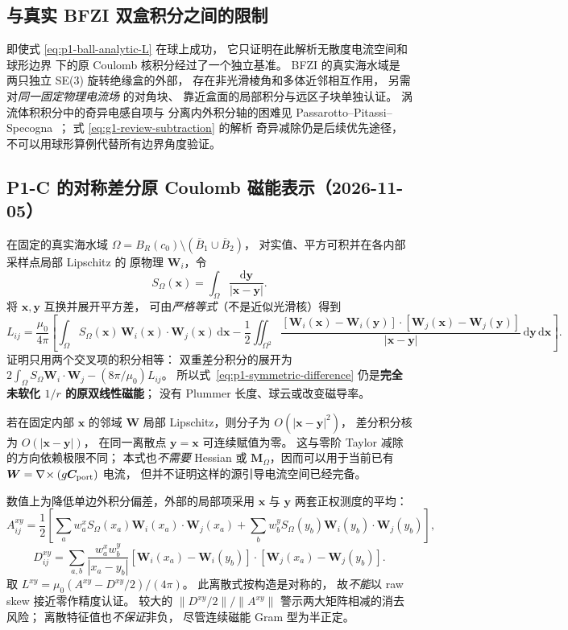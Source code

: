 \subsection{与真实 BFZI 双盒积分之间的限制}
即使式 \eqref{eq:p1-ball-analytic-L} 在球上成功，
它只证明在此解析无散度电流空间和球形边界
下的原 Coulomb 核积分经过了一个独立基准。
BFZI 的真实海水域是
两只独立 SE(3) 旋转绝缘盒的外部，
存在非光滑棱角和多体近邻相互作用，
另需对\emph{同一固定物理电流场} 的对角块、
靠近盒面的局部积分与远区子块单独认证。
涡流体积积分中的奇异电感自项与
分离内外积分轴的困难见
Passarotto--Pitassi--Specogna~\cite{passarotto2022}；
式 \eqref{eq:g1-review-subtraction} 的解析
奇异减除仍是后续优先途径，
不可以用球形算例代替所有边界角度验证。


\subsection{P1-C 的对称差分原 Coulomb 磁能表示（2026-11-05）}
\label{sec:p1-symmetric-difference}
在固定的真实海水域
$\Omega=B_R(c_0)\setminus(\overline B_1\cup\overline B_2)$，
对实值、平方可积并在各内部采样点局部 Lipschitz 的
原物理 $\bm W_i$，令
\[
 S_\Omega(\bm x)=\int_\Omega
  \frac{\mathrm d\bm y}{|\bm x-\bm y|}.
\]
将 $\bm x,\bm y$ 互换并展开平方差，
可由\emph{严格等式}（不是近似光滑核）得到
\begin{equation}
\label{eq:p1-symmetric-difference}
\boxed{
 L_{ij}=\frac{\mu_0}{4\pi}
 \left[
 \int_\Omega S_\Omega(\bm x)\,
      \bm W_i(\bm x)\cdot\bm W_j(\bm x)\,\mathrm d\bm x
 -\frac12\iint_{\Omega^2}
 \frac{[\bm W_i(\bm x)-\bm W_i(\bm y)]\cdot
       [\bm W_j(\bm x)-\bm W_j(\bm y)]}
      {|\bm x-\bm y|}\,\mathrm d\bm y\,\mathrm d\bm x
 \right].
}
\end{equation}
证明只用两个交叉项的积分相等：
双重差分积分的展开为
$2\int_\Omega S_\Omega\bm W_i\cdot\bm W_j
 -(8\pi/\mu_0)L_{ij}$。
所以式~\eqref{eq:p1-symmetric-difference}
仍是\textbf{完全未软化 $1/r$ 的原双线性磁能}；
没有 Plummer 长度、球云或改变磁导率。

若在固定内部 $\bm x$ 的邻域
$\bm W$ 局部 Lipschitz，则分子为
$O(|\bm x-\bm y|^2)$，
差分积分核为 $O(|\bm x-\bm y|)$，
在同一离散点 $\bm y=\bm x$ 可连续赋值为零。
这与零阶 Taylor 减除的方向依赖极限不同；
本式也\emph{不需要} Hessian 或
$\bm M_\Omega$，因而可以用于当前已有
$\bm W=\nabla\!\times(g\bm C_{\rm port})$ 电流，
但并不证明这样的源引导电流空间已经完备。

数值上为降低单边外积分偏差，外部的局部项采用
$\bm x$ 与 $\bm y$ 两套正权测度的平均：
\[
 A_{ij}^{xy}=\frac12\left[
 \sum_a w_a^x S_\Omega(x_a)\bm W_i(x_a)\cdot\bm W_j(x_a)
 +\sum_b w_b^y S_\Omega(y_b)\bm W_i(y_b)\cdot\bm W_j(y_b)
 \right],
\]
\[
 D_{ij}^{xy}=\sum_{a,b}
 \frac{w_a^xw_b^y}{|x_a-y_b|}
 [\bm W_i(x_a)-\bm W_i(y_b)]\cdot
 [\bm W_j(x_a)-\bm W_j(y_b)].
\]
取 $L^{xy}=\mu_0(A^{xy}-D^{xy}/2)/(4\pi)$。
此离散式按构造是对称的，
故\emph{不能}以 raw skew 接近零作精度认证。
较大的 $\|D^{xy}/2\|/\|A^{xy}\|$
警示两大矩阵相减的消去风险；
离散特征值也\emph{不保证}非负，
尽管连续磁能 Gram 型为半正定。

